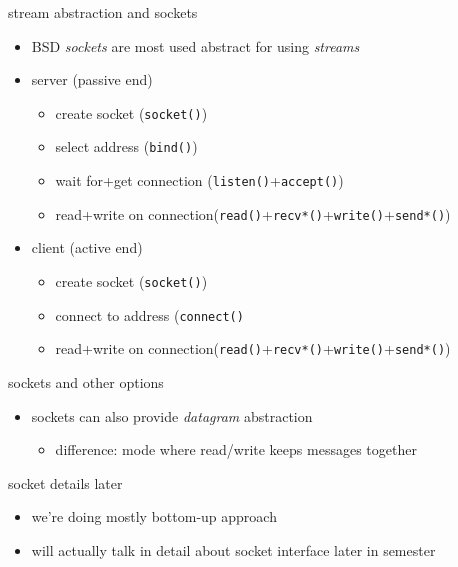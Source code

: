 \begin{frame}{stream abstraction and sockets}
    \begin{itemize}
    \item BSD \textit{sockets} are most used abstract for using \textit{streams}
    \item server (passive end)
        \begin{itemize}
        \item create socket (\texttt{socket()})
        \item select address (\texttt{bind()})
        \item wait for+get connection (\texttt{listen()}+\texttt{accept()})
        \item read+write on connection(\texttt{read()}+\texttt{recv*()}+\texttt{write()}+\texttt{send*()})
        \end{itemize}
    \item client (active end)
        \begin{itemize}
        \item create socket (\texttt{socket()})
        \item connect to address (\texttt{connect()}
        \item read+write on connection(\texttt{read()}+\texttt{recv*()}+\texttt{write()}+\texttt{send*()})
        \end{itemize}
    \end{itemize}
\end{frame}

\begin{frame}{sockets and other options}
    \begin{itemize}
    \item sockets can also provide \textit{datagram} abstraction
        \begin{itemize}
        \item difference: mode where read/write keeps messages together
        \end{itemize}
    \end{itemize}
\end{frame}

\begin{frame}{socket details later}
    \begin{itemize}
    \item we're doing mostly bottom-up approach
    \item will actually talk in detail about socket interface later in semester
    \end{itemize}
\end{frame}
